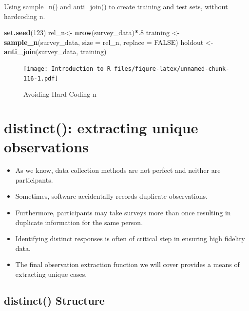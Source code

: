 \documentclass[]{book}
\newenvironment{Shaded}{\begin{snugshade}}{\end{snugshade}}
\newcommand{\DataTypeTok}[1]{\textcolor[rgb]{0.13,0.29,0.53}{#1}}
\newcommand{\DecValTok}[1]{\textcolor[rgb]{0.00,0.00,0.81}{#1}}
\newcommand{\KeywordTok}[1]{\textcolor[rgb]{0.13,0.29,0.53}{\textbf{#1}}}
\newcommand{\NormalTok}[1]{#1}
\newcommand{\OperatorTok}[1]{\textcolor[rgb]{0.81,0.36,0.00}{\textbf{#1}}}
\newcommand{\OtherTok}[1]{\textcolor[rgb]{0.56,0.35,0.01}{#1}}
\newcommand{\StringTok}[1]{\textcolor[rgb]{0.31,0.60,0.02}{#1}}
\providecommand{\tightlist}{%
  \setlength{\itemsep}{0pt}\setlength{\parskip}{0pt}}
\theoremstyle{definition}
\theoremstyle{definition}
\theoremstyle{definition}
\theoremstyle{remark}
\let\BeginKnitrBlock\begin \let\EndKnitrBlock\end
\begin{document}
\BeginKnitrBlock{example}
\protect\hypertarget{exm:samplen2}{}{\label{exm:samplen2} }Using sample\_n() and anti\_join() to create training and test sets, without hardcoding n.
\EndKnitrBlock{example}

\begin{Shaded}
\begin{Highlighting}[]
\KeywordTok{set.seed}\NormalTok{(}\DecValTok{123}\NormalTok{)}
\NormalTok{rel_n<-}\StringTok{ }\KeywordTok{nrow}\NormalTok{(survey_data)}\OperatorTok{*}\NormalTok{.}\DecValTok{8}
\NormalTok{training <-}\StringTok{ }\KeywordTok{sample_n}\NormalTok{(survey_data, }\DataTypeTok{size =}\NormalTok{ rel_n, }\DataTypeTok{replace =} \OtherTok{FALSE}\NormalTok{)}
\NormalTok{holdout <-}\StringTok{ }\KeywordTok{anti_join}\NormalTok{(survey_data, training)}
\end{Highlighting}
\end{Shaded}

\begin{figure}
\centering
\texttt{[image: Introduction\_to\_R\_files/figure-latex/unnamed-chunk-116-1.pdf]}
\caption{\label{fig:unnamed-chunk-116}Avoiding Hard Coding n}
\end{figure}

\hypertarget{distinct-extracting-unique-observations}{%
\section{distinct(): extracting unique observations}\label{distinct-extracting-unique-observations}}

\begin{itemize}
\tightlist
\item
  As we know, data collection methods are not perfect and neither are participants.
\item
  Sometimes, software accidentally records duplicate observations.
\item
  Furthermore, participants may take surveys more than once resulting in duplicate information for the same person.
\item
  Identifying distinct responses is often of critical step in ensuring high fidelity data.
\item
  The final observation extraction function we will cover provides a means of extracting unique cases.
\end{itemize}

\hypertarget{distinct-structure}{%
\subsection{distinct() Structure}\label{distinct-structure}}
\end{document}
